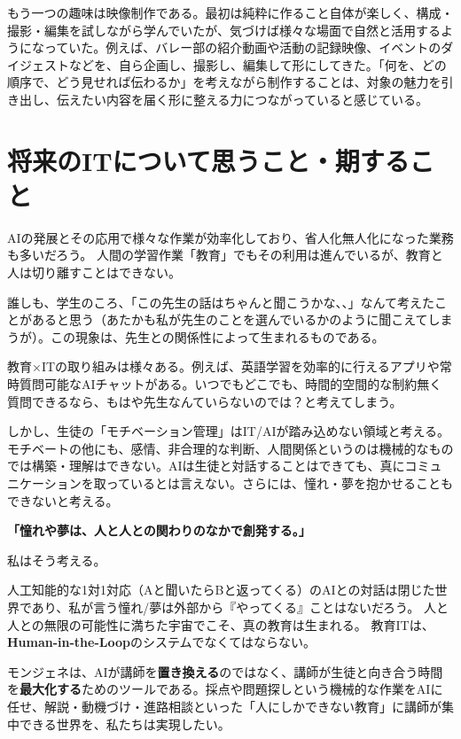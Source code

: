 \documentclass[paper=a4,fontsize=10.5bp,jafontsize=10.5bp,twocolumn]{jlreq}
\begin{document}
もう一つの趣味は映像制作である。最初は純粋に作ること自体が楽しく、構成・撮影・編集を試しながら学んでいたが、気づけば様々な場面で自然と活用するようになっていた。例えば、バレー部の紹介動画や活動の記録映像、イベントのダイジェストなどを、自ら企画し、撮影し、編集して形にしてきた。「何を、どの順序で、どう見せれば伝わるか」を考えながら制作することは、対象の魅力を引き出し、伝えたい内容を届く形に整える力につながっていると感じている。

\section{将来のITについて思うこと・期すること}

AIの発展とその応用で様々な作業が効率化しており、省人化無人化になった業務も多いだろう。
人間の学習作業「教育」でもその利用は進んでいるが、教育と人は切り離すことはできない。

誰しも、学生のころ、「この先生の話はちゃんと聞こうかな、、」なんて考えたことがあると思う（あたかも私が先生のことを選んでいるかのように聞こえてしまうが）。この現象は、先生との関係性によって生まれるものである。

教育×ITの取り組みは様々ある。例えば、英語学習を効率的に行えるアプリや常時質問可能なAIチャットがある。いつでもどこでも、時間的空間的な制約無く質問できるなら、もはや先生なんていらないのでは？と考えてしまう。

しかし、生徒の「モチベーション管理」はIT/AIが踏み込めない領域と考える。モチベートの他にも、感情、非合理的な判断、人間関係というのは機械的なものでは構築・理解はできない。AIは生徒と対話することはできても、真にコミュニケーションを取っているとは言えない。さらには、憧れ・夢を抱かせることもできないと考える。

\begin{highlightbox}
\textbf{「憧れや夢は、人と人との関わりのなかで創発する。」}

私はそう考える。

人工知能的な1対1対応（Aと聞いたらBと返ってくる）のAIとの対話は閉じた世界であり、私が言う憧れ/夢は外部から『やってくる』ことはないだろう。
人と人との無限の可能性に満ちた宇宙でこそ、真の教育は生まれる。
教育ITは、\textbf{Human-in-the-Loop}のシステムでなくてはならない。
\end{highlightbox}

モンジェネは、AIが講師を\textbf{置き換える}のではなく、講師が生徒と向き合う時間を\textbf{最大化する}ためのツールである。採点や問題探しという機械的な作業をAIに任せ、解説・動機づけ・進路相談といった「人にしかできない教育」に講師が集中できる世界を、私たちは実現したい。
\end{document}
